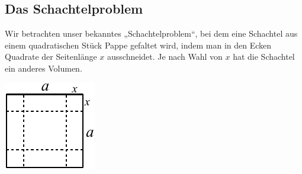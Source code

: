 \documentclass[11pt,a4paper,twoside,fleqn]{article}
\begin{document}
\subsection{Das Schachtelproblem}
\noindent\begin{minipage}[t]{.75\linewidth}
  Wir betrachten unser bekanntes „Schachtelproblem“, bei dem eine
  Schachtel aus einem quadratischen Stück Pappe gefaltet wird, indem
  man in den Ecken Quadrate der Seitenlänge $x$ ausschneidet. Je nach
  Wahl von $x$ hat die Schachtel ein anderes Volumen.
\end{minipage}\hfill
\begin{minipage}[t]{.2\linewidth}
  \vspace{-3\baselineskip}\includegraphics[width=\linewidth]{pics/1_schachtel_1}
\end{minipage}
\end{document}
